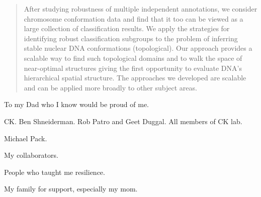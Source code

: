 \documentclass[12pt]{cmuthesis}
\begin{document}
\begin{abstract}
After studying robustness of multiple independent annotations, we consider chromosome conformation data and find that it too can be viewed as a large collection of classification results. We apply the strategies for identifying  robust classification subgroups to the problem of inferring stable nuclear DNA conformations (topological). Our approach provides a scalable way to find such topological domains and to walk the space of near-optimal structures giving the first opportunity to evaluate DNA's hierarchical spatial structure.
The approaches we developed are scalable and can be applied more broadly to other subject areas. %




\end{abstract}


\begin{dedication}
To my Dad who I know would be proud of me.
\end{dedication}

\begin{acknowledgments}
CK. Ben Shneiderman. Rob Patro and Geet Duggal. All members of CK lab.

Michael Pack.

My collaborators.

People who taught me resilience.

My family for support, especially my mom.
\end{acknowledgments}
\end{document}
